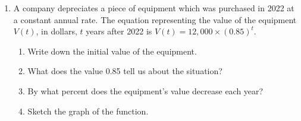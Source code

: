 \documentclass[12pt, twoside]{article}
\begin{document}
\begin{enumerate}
\item A company depreciates a piece of equipment which was purchased in 2022 at a constant annual rate. The equation representing the value of the equipment $V(t)$, in dollars, $t$ years after 2022 is $\displaystyle V(t)=12,000 \times (0.85)^t$.

\begin{multicols}{2}
    \begin{enumerate}[itemsep=1cm]
        \item Write down the initial value of the equipment.
        \item What does the value 0.85 tell us about the situation? \vspace{1cm}
        \item By what percent does the equipment's value decrease each year?
        \item Sketch the graph of the function.
    \end{enumerate}
    \begin{center}
    \end{center}
    \end{multicols}

\end{enumerate}
\end{document}
